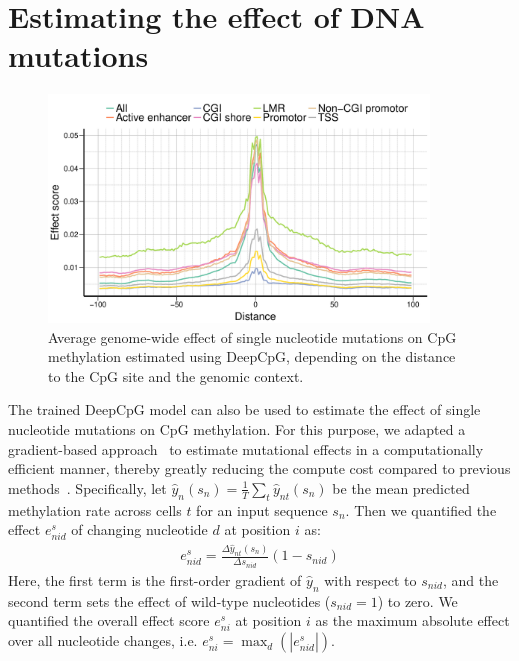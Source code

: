 \section{Estimating the effect of DNA mutations}

\begin{figure}[htbp!]
\centering
\includegraphics[width=0.9\textwidth]{mut_global}
\caption[Average genome-wide effect of single nucleotide mutations on CpG methylation estimated using DeepCpG.]{Average genome-wide effect of single nucleotide mutations on CpG methylation estimated using DeepCpG, depending on the distance to the CpG site and the genomic context.}
\label{fig:dcpg_mut_global}
\end{figure}

The trained DeepCpG model can also be used to estimate the effect of single nucleotide mutations on CpG methylation. For this purpose, we adapted a gradient-based approach~\citep{simonyan_deep_2013} to estimate mutational effects in a computationally efficient manner, thereby greatly reducing the compute cost compared to previous methods~\citep{alipanahi_predicting_2015,zhou_predicting_2015,zhou_predicting_2015}. Specifically, let $\hat{y}_n(s_n)=\frac{1}{T}\sum_t \hat{y}_{nt}(s_n)$ be the mean predicted methylation rate across cells $t$ for an input sequence $s_n$. Then we quantified the effect $e^s_{nid}$ of changing nucleotide $d$ at position $i$ as:
\begin{align}
  e^s_{nid}=\frac{\Delta \hat{y}_{nt}(s_n)}{\Delta s_{nid}}(1-s_{nid})
\end{align}
Here, the first term is the first-order gradient of $\hat{y}_n$ with respect to $s_{nid}$, and the second term sets the effect of wild-type nucleotides ($s_{nid}=1$) to zero. We quantified the overall effect score $e^s_{ni}$ at position $i$ as the maximum absolute effect over all nucleotide changes, i.e. $e^s_{ni}=\max_d(|e^s_{nid}|)$.


